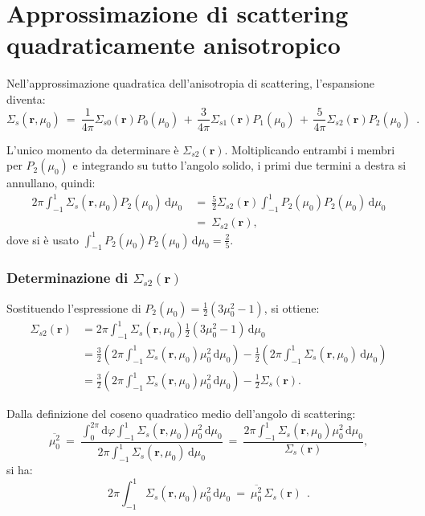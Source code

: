 \section{Approssimazione di scattering quadraticamente anisotropico}
Nell'approssimazione quadratica dell'anisotropia di scattering, l’espansione diventa:
\begin{equation}
	\Sigma_s(\mathbf{r}, \mu_0)\ =\ \frac{1}{4\pi} \Sigma_{s0}(\mathbf{r}) P_0(\mu_0)\, +\, \frac{3}{4\pi} \Sigma_{s1}(\mathbf{r}) P_1(\mu_0)\, +\, \frac{5}{4\pi} \Sigma_{s2}(\mathbf{r}) P_2(\mu_0)\ \ .
\end{equation}

L'unico momento da determinare è $\Sigma_{s2}(\mathbf{r})$. Moltiplicando entrambi i membri per $P_2(\mu_0)$ e integrando su tutto l'angolo solido, i primi due termini a destra si annullano, quindi:
\begin{equation}
	\begin{aligned}
		2\pi \int_{-1}^{1} \Sigma_s(\mathbf{r}, \mu_0) P_2(\mu_0) \, \mathrm{d}\mu_0\ &=\ \frac{5}{2} \Sigma_{s2}(\mathbf{r}) \int_{-1}^{1} P_2(\mu_0) P_2(\mu_0) \, \mathrm{d}\mu_0 \\
		&=\ \Sigma_{s2}(\mathbf{r}),
	\end{aligned}
\end{equation}
dove si è usato $\int_{-1}^{1} P_2(\mu_0) P_2(\mu_0) \, \mathrm{d}\mu_0 = \frac{2}{5}$.


\subsubsection{Determinazione di $\Sigma_{s2}(\mathbf{r})$}
Sostituendo l'espressione di $P_2(\mu_0) = \frac{1}{2} (3\mu_0^2 - 1)$, si ottiene:
\begin{equation}
	\begin{aligned}
		\Sigma_{s2}(\mathbf{r}) &= 2\pi \int_{-1}^{1} \Sigma_s(\mathbf{r}, \mu_0) \frac{1}{2} (3\mu_0^2 - 1) \, \mathrm{d}\mu_0 \\
		&= \frac{3}{2} \left(2\pi \int_{-1}^{1} \Sigma_s(\mathbf{r}, \mu_0) \mu_0^2 \, \mathrm{d}\mu_0\right) - \frac{1}{2} \left(2\pi \int_{-1}^{1} \Sigma_s(\mathbf{r}, \mu_0) \, \mathrm{d}\mu_0\right) \\
		&= \frac{3}{2} \left(2\pi \int_{-1}^{1} \Sigma_s(\mathbf{r}, \mu_0) \mu_0^2 \, \mathrm{d}\mu_0\right) - \frac{1}{2} \Sigma_s(\mathbf{r}).
	\end{aligned}
\end{equation}

Dalla definizione del coseno quadratico medio dell'angolo di scattering:
\begin{equation}
	\overline{\mu_0^2}\ =\ \frac{\int_{0}^{2\pi} \mathrm{d}\varphi \int_{-1}^{1} \Sigma_s(\mathbf{r}, \mu_0) \mu_0^2 \, \mathrm{d}\mu_0}{2\pi \int_{-1}^{1} \Sigma_s(\mathbf{r}, \mu_0) \, \mathrm{d}\mu_0}\ =\ \frac{2\pi \int_{-1}^{1} \Sigma_s(\mathbf{r}, \mu_0) \mu_0^2 \, \mathrm{d}\mu_0}{\Sigma_s(\mathbf{r})},
\end{equation}
si ha:
\begin{equation}
	2\pi \int_{-1}^{1} \Sigma_s(\mathbf{r}, \mu_0) \mu_0^2 \, \mathrm{d}\mu_0\ =\ \overline{\mu_0^2}\, \Sigma_s(\mathbf{r})\ \ .
\end{equation}

